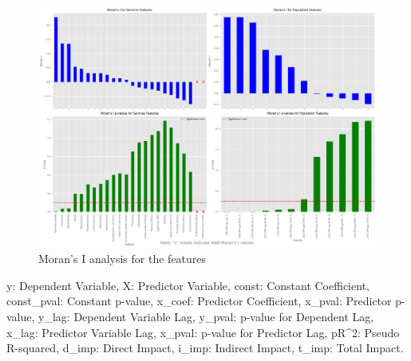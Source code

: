 \documentclass[
	a4paper, %
	10pt, %
	unnumberedsections, %
	twoside, %
]{LTJournalArticle}
\begin{document}
\begin{figure}
  \includegraphics[scale=0.5]{moran_i_analysis.png}
  \caption{Moran's I analysis for the features}
  \label{fig:moran_part_A}
\end{figure}



\pagebreak
\clearpage




\begin{small}
  y: Dependent Variable, X: Predictor Variable, const: Constant Coefficient, const\_pval: Constant p-value, x\_coef: Predictor Coefficient, x\_pval: Predictor p-value, y\_lag: Dependent Variable Lag, y\_pval: p-value for Dependent Lag, x\_lag: Predictor Variable Lag, x\_pval: p-value for Predictor Lag, pR\^{}2: Pseudo R-squared, d\_imp: Direct Impact, i\_imp: Indirect Impact, t\_imp: Total Impact.
\end{small}


\twocolumn
\printbibliography
\end{document}
